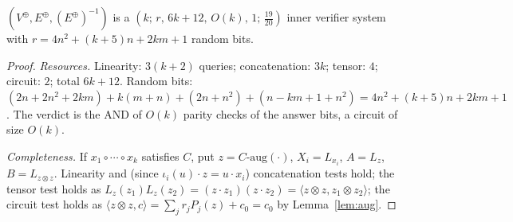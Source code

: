 \begin{theorem}\label{thm:vplus}
$(V^\oplus,E^\oplus,(E^\oplus)^{-1})$ is a $(k;\,r,\,6k+12,\,O(k),\,1;\,\tfrac{19}{20})$ inner verifier system with $r=4n^2+(k+5)n+2km+1$ random bits.
\end{theorem}
\begin{proof}
\emph{Resources.}  Linearity: $3(k+2)$ queries; concatenation: $3k$; tensor: $4$; circuit: $2$; total $6k+12$.  Random bits: $(2n+2n^2+2km)+k(m+n)+(2n+n^2)+(n-km+1+n^2)=4n^2+(k+5)n+2km+1$.
The verdict is the AND of $O(k)$ parity checks of the answer bits, a circuit of size $O(k)$.

\emph{Completeness.}  If $x_1\circ\cdots\circ x_k$ satisfies $C$, put $z=C\text{-aug}(\cdot)$, $X_i=L_{x_i}$, $A=L_z$, $B=L_{z\otimes z}$.  Linearity and (since $\iota_i(u)\cdot z=u\cdot x_i$) concatenation tests hold; the tensor test holds as $L_z(z_1)L_z(z_2)=(z\cdot z_1)(z\cdot z_2)=\langle z\otimes z,z_1\otimes z_2\rangle$;
the circuit test holds as $\langle z\otimes z,c\rangle=\sum_jr_jP_j(z)+c_0=c_0$ by Lemma~\ref{lem:aug}.


\end{proof}

